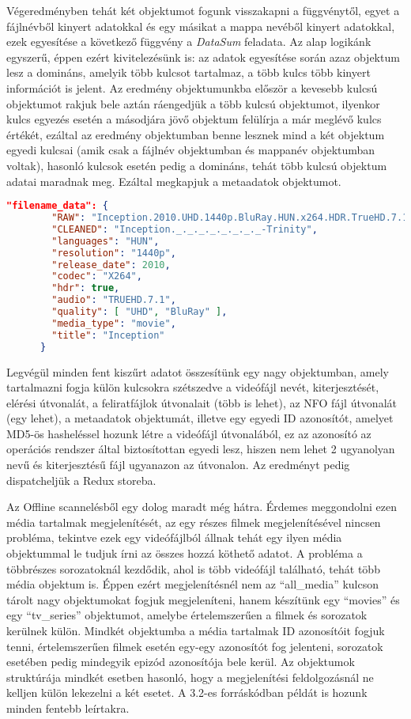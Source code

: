 Végeredményben tehát két objektumot fogunk visszakapni a függvénytől, egyet a fájlnévből kinyert adatokkal és egy másikat a mappa nevéből kinyert adatokkal, ezek egyesítése a következő függvény a {\it DataSum} feladata. Az alap logikánk egyszerű, éppen ezért kivitelezésünk is: az adatok egyesítése során azaz objektum lesz a domináns, amelyik több kulcsot tartalmaz, a több kulcs több kinyert információt is jelent. Az eredmény objektumunkba először a kevesebb kulcsú objektumot rakjuk bele aztán ráengedjük a több kulcsú objektumot, ilyenkor kulcs egyezés esetén a másodjára jövő objektum felülírja a már meglévő kulcs értékét, ezáltal az eredmény objektumban benne lesznek mind a két objektum egyedi kulcsai (amik csak a fájlnév objektumban és mappanév objektumban voltak), hasonló kulcsok esetén pedig a domináns, tehát több kulcsú objektum adatai maradnak meg. Ezáltal megkapjuk a metaadatok objektumot.

\begin{lstlisting}[language={json}]
    "filename_data": {
        "RAW": "Inception.2010.UHD.1440p.BluRay.HUN.x264.HDR.TrueHD.7.1-Trinity",
        "CLEANED": "Inception._._._._._._._._-Trinity",
        "languages": "HUN",
        "resolution": "1440p",
        "release_date": 2010,
        "codec": "X264",
        "hdr": true,
        "audio": "TRUEHD.7.1",
        "quality": [ "UHD", "BluRay" ],
        "media_type": "movie",
        "title": "Inception"
      }
\end{lstlisting}

Legvégül minden fent kiszűrt adatot összesítünk egy nagy objektumban, amely tartalmazni fogja külön kulcsokra szétszedve a videófájl nevét, kiterjesztését, elérési útvonalát, a feliratfájlok útvonalait (több is lehet), az NFO fájl útvonalát (egy lehet), a metaadatok objektumát, illetve egy egyedi ID azonosítót, amelyet MD5-ös hasheléssel hozunk létre a videófájl útvonalából, ez az azonosító az operációs rendszer által biztosítottan egyedi lesz, hiszen nem lehet 2 ugyanolyan nevű és kiterjesztésű fájl ugyanazon az útvonalon. Az eredményt pedig dispatcheljük a Redux storeba.

Az Offline scannelésből egy dolog maradt még hátra. Érdemes meggondolni ezen média tartalmak megjelenítését, az egy részes filmek megjelenítésével nincsen probléma, tekintve ezek egy videófájlból állnak tehát egy ilyen média objektummal le tudjuk írni az összes hozzá köthető adatot. A probléma a többrészes sorozatoknál kezdődik, ahol is több videófájl található, tehát több média objektum is. Éppen ezért megjelenítésnél nem az ``all\_media'' kulcson tárolt nagy objektumokat fogjuk megjeleníteni, hanem készítünk egy ``movies'' és egy ``tv\_series'' objektumot, amelybe értelemszerűen a filmek és sorozatok kerülnek külön. Mindkét objektumba a média tartalmak ID azonosítóit fogjuk tenni, értelemszerűen filmek esetén egy-egy azonosítót fog jelenteni, sorozatok esetében pedig mindegyik epizód azonosítója bele kerül. Az objektumok struktúrája mindkét esetben hasonló, hogy a megjelenítési feldolgozásnál ne kelljen külön lekezelni a két esetet. A 3.2-es forráskódban példát is hozunk minden fentebb leírtakra.

